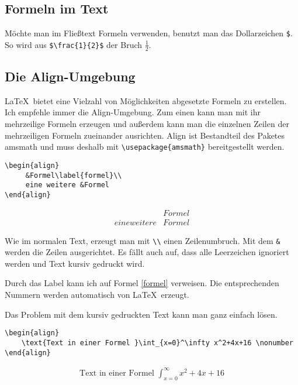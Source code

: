 \subsection{Formeln im Text}

Möchte man im Fließtext Formeln verwenden, benutzt man das Dollarzeichen \verb+$+. So wird aus \verb+$\frac{1}{2}$+ der Bruch $\frac{1}{2}$.

\subsection{Die Align-Umgebung}

\LaTeX\ bietet eine Vielzahl von Möglichkeiten abgesetzte Formeln zu erstellen. Ich empfehle immer die Align-Umgebung. Zum einen kann man mit ihr mehrzeilige Formeln erzeugen und außerdem kann man die einzelnen Zeilen der mehrzeiligen Formeln zueinander ausrichten. Align ist Bestandteil des Paketes amsmath und muss deshalb mit \verb|\usepackage{amsmath}| bereitgestellt werden.

\begin{verbatim}
\begin{align}
     &Formel\label{formel}\\
     eine weitere &Formel
\end{align}
\end{verbatim}

\begin{align}
    &Formel\label{formel}\\
    eine weitere &Formel
\end{align}

Wie im normalen Text, erzeugt man mit \verb|\\| einen Zeilenumbruch. Mit dem \verb|&| werden die Zeilen ausgerichtet. Es fällt auch auf, dass alle Leerzeichen ignoriert werden und Text kursiv gedruckt wird.

Durch das Label kann ich auf Formel \ref{formel} verweisen. Die entsprechenden Nummern werden automatisch von \LaTeX\ erzeugt.

Das Problem mit dem kursiv gedruckten Text kann man ganz einfach lösen.

\begin{verbatim}
\begin{align}
    \text{Text in einer Formel }\int_{x=0}^\infty x^2+4x+16 \nonumber
\end{align}
\end{verbatim}

\begin{align}
    \text{Text in einer Formel }\int_{x=0}^\infty x^2+4x+16 \nonumber
\end{align}

